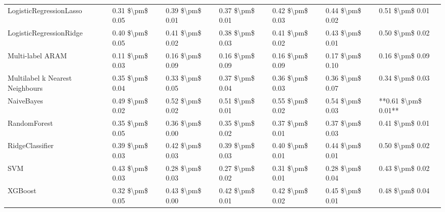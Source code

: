 \begin{tabular}{lllllll}
LogisticRegressionLasso         &  0.31 \$\textbackslash pm\$ 0.05 &           0.39 \$\textbackslash pm\$ 0.01 &       0.37 \$\textbackslash pm\$ 0.01 &        0.42 \$\textbackslash pm\$ 0.03 &                         0.44 \$\textbackslash pm\$ 0.02 &      0.51 \$\textbackslash pm\$ 0.01 \\
LogisticRegressionRidge         &  0.40 \$\textbackslash pm\$ 0.05 &           0.41 \$\textbackslash pm\$ 0.02 &       0.38 \$\textbackslash pm\$ 0.03 &        0.41 \$\textbackslash pm\$ 0.02 &                         0.43 \$\textbackslash pm\$ 0.01 &      0.50 \$\textbackslash pm\$ 0.02 \\
Multi-label ARAM                &  0.11 \$\textbackslash pm\$ 0.03 &           0.16 \$\textbackslash pm\$ 0.09 &       0.16 \$\textbackslash pm\$ 0.09 &        0.16 \$\textbackslash pm\$ 0.09 &                         0.17 \$\textbackslash pm\$ 0.10 &      0.16 \$\textbackslash pm\$ 0.09 \\
Multilabel k Nearest Neighbours &  0.35 \$\textbackslash pm\$ 0.04 &           0.33 \$\textbackslash pm\$ 0.05 &       0.37 \$\textbackslash pm\$ 0.04 &        0.36 \$\textbackslash pm\$ 0.03 &                         0.36 \$\textbackslash pm\$ 0.07 &      0.34 \$\textbackslash pm\$ 0.03 \\
NaiveBayes                      &  0.49 \$\textbackslash pm\$ 0.02 &           0.52 \$\textbackslash pm\$ 0.02 &       0.51 \$\textbackslash pm\$ 0.01 &        0.55 \$\textbackslash pm\$ 0.02 &                         0.54 \$\textbackslash pm\$ 0.03 &  **0.61 \$\textbackslash pm\$ 0.01** \\
RandomForest                    &  0.35 \$\textbackslash pm\$ 0.05 &           0.36 \$\textbackslash pm\$ 0.00 &       0.35 \$\textbackslash pm\$ 0.02 &        0.37 \$\textbackslash pm\$ 0.01 &                         0.37 \$\textbackslash pm\$ 0.03 &      0.41 \$\textbackslash pm\$ 0.01 \\
RidgeClassifier                 &  0.39 \$\textbackslash pm\$ 0.03 &           0.42 \$\textbackslash pm\$ 0.03 &       0.39 \$\textbackslash pm\$ 0.03 &        0.40 \$\textbackslash pm\$ 0.01 &                         0.44 \$\textbackslash pm\$ 0.01 &      0.50 \$\textbackslash pm\$ 0.02 \\
SVM                             &  0.43 \$\textbackslash pm\$ 0.03 &           0.28 \$\textbackslash pm\$ 0.03 &       0.27 \$\textbackslash pm\$ 0.02 &        0.31 \$\textbackslash pm\$ 0.01 &                         0.28 \$\textbackslash pm\$ 0.04 &      0.43 \$\textbackslash pm\$ 0.02 \\
XGBoost                         &  0.32 \$\textbackslash pm\$ 0.05 &           0.43 \$\textbackslash pm\$ 0.00 &       0.42 \$\textbackslash pm\$ 0.01 &        0.42 \$\textbackslash pm\$ 0.02 &                         0.45 \$\textbackslash pm\$ 0.01 &      0.48 \$\textbackslash pm\$ 0.04 \\
\bottomrule
\end{tabular}
